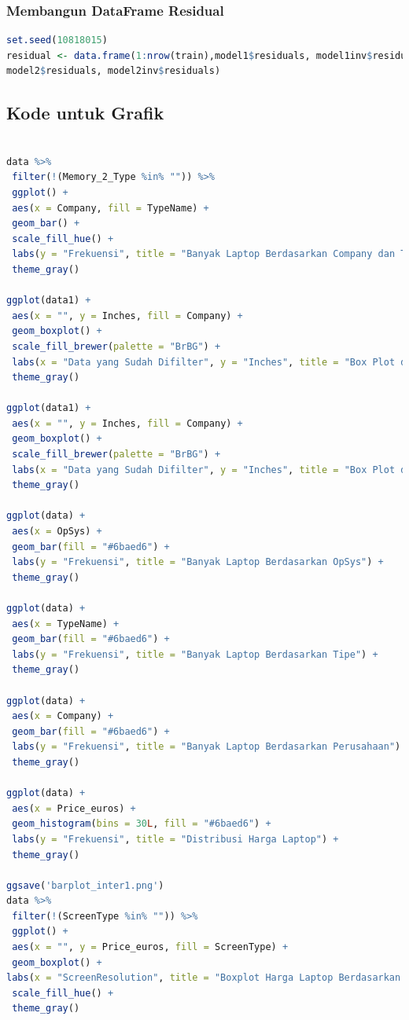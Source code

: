 \documentclass[12pt]{article}
\begin{document}
\subsubsection{Membangun DataFrame Residual}
\begin{lstlisting}[language=R]
set.seed(10818015)
residual <- data.frame(1:nrow(train),model1$residuals, model1inv$residuals, 
model2$residuals, model2inv$residuals)
\end{lstlisting}

\subsection{Kode untuk Grafik}
\begin{lstlisting}[language=R]

data %>%
 filter(!(Memory_2_Type %in% "")) %>%
 ggplot() +
 aes(x = Company, fill = TypeName) +
 geom_bar() +
 scale_fill_hue() +
 labs(y = "Frekuensi", title = "Banyak Laptop Berdasarkan Company dan TypeName") +
 theme_gray()

ggplot(data1) +
 aes(x = "", y = Inches, fill = Company) +
 geom_boxplot() +
 scale_fill_brewer(palette = "BrBG") +
 labs(x = "Data yang Sudah Difilter", y = "Inches", title = "Box Plot dari Masing-Masing Company") +
 theme_gray()

ggplot(data1) +
 aes(x = "", y = Inches, fill = Company) +
 geom_boxplot() +
 scale_fill_brewer(palette = "BrBG") +
 labs(x = "Data yang Sudah Difilter", y = "Inches", title = "Box Plot dari Masing-Masing Company") +
 theme_gray()
 
ggplot(data) +
 aes(x = OpSys) +
 geom_bar(fill = "#6baed6") +
 labs(y = "Frekuensi", title = "Banyak Laptop Berdasarkan OpSys") +
 theme_gray()

ggplot(data) +
 aes(x = TypeName) +
 geom_bar(fill = "#6baed6") +
 labs(y = "Frekuensi", title = "Banyak Laptop Berdasarkan Tipe") +
 theme_gray()

ggplot(data) +
 aes(x = Company) +
 geom_bar(fill = "#6baed6") +
 labs(y = "Frekuensi", title = "Banyak Laptop Berdasarkan Perusahaan") +
 theme_gray()

ggplot(data) +
 aes(x = Price_euros) +
 geom_histogram(bins = 30L, fill = "#6baed6") +
 labs(y = "Frekuensi", title = "Distribusi Harga Laptop") +
 theme_gray()

ggsave('barplot_inter1.png')
data %>%
 filter(!(ScreenType %in% "")) %>%
 ggplot() +
 aes(x = "", y = Price_euros, fill = ScreenType) +
 geom_boxplot() +
labs(x = "ScreenResolution", title = "Boxplot Harga Laptop Berdasarkan ScreenResolution")+
 scale_fill_hue() +
 theme_gray()


\end{lstlisting}
\end{document}

